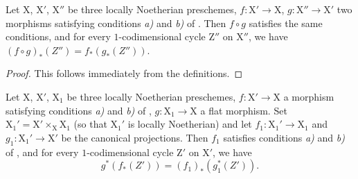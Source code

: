 \begin{proposition}[21.10.15]
\label{IV.21.10.15}
Let $\mathrm{X}$, $\mathrm{X}'$, $\mathrm{X}''$ be three locally Noetherian preschemes, $f:\mathrm{X}'\to\mathrm{X}$, $g:\mathrm{X}''\to\mathrm{X}'$ two morphisms satisfying conditions \emph{a)} and \emph{b)} of .
Then $f\circ g$ satisfies the same conditions, and for every $1$-codimensional cycle $\mathrm{Z}''$ on $\mathrm{X}''$, we have $(f\circ g)_*(Z'')=f_*(g_*(Z''))$.
\end{proposition}

\begin{proof}
This follows immediately from the definitions.
\end{proof}

\begin{proposition}[21.10.16]
\label{IV.21.10.16}
Let $\mathrm{X}$, $\mathrm{X}'$, $\mathrm{X}_1$ be three locally Noetherian preschemes, $f:\mathrm{X}'\to\mathrm{X}$ a morphism satisfying conditions \emph{a)} and \emph{b)} of , $g:\mathrm{X}_1\to\mathrm{X}$ a flat morphism.
Set $\mathrm{X}_1'=\mathrm{X}'\times_{\mathrm{X}}\mathrm{X}_1$ (so that $\mathrm{X}_1'$ is locally Noetherian) and let $f_1:\mathrm{X}_1'\to\mathrm{X}_1$ and $g_1:\mathrm{X}_1'\to\mathrm{X}'$ be the canonical projections.
Then $f_1$ satisfies conditions \emph{a)} and \emph{b)} of , and for every $1$-codimensional cycle $\mathrm{Z}'$ on $\mathrm{X}'$, we have
\[
\label{IV.21.10.16.1}
  g^*(f_*(Z'))=(f_1)_*(g_1^*(Z')).
  \tag{21.10.16.1}
\]
\end{proposition}

